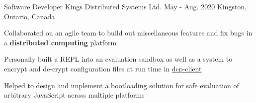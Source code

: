 \begin{cventries}
  \cventry
    {Software Developer} %
    {Kings Distributed Systems Ltd.} %
    {May - Aug. 2020} %
    {Kingston, Ontario, Canada} %
    {
      \begin{cvitems} %
        \item{Collaborated on an agile team to build out miscellaneous features and fix bugs in a \textbf{distributed computing} platform}
        \item{Personally built a REPL into an evaluation sandbox as well as a system to encrypt and de-crypt configuration files at run time in \href{https://www.npmjs.com/package/dcp-client}{dcp-client}}
        \item{Helped to design and implement a bootloading solution for safe evaluation of arbitrary JavaScript across multiple platforms}
      \end{cvitems}
    }


\end{cventries}
